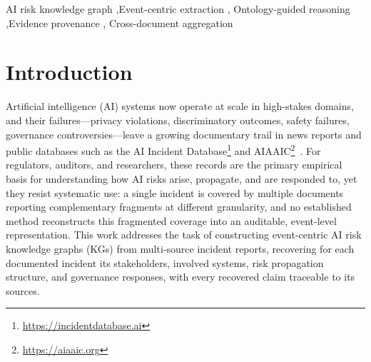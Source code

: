 \documentclass[a4paper,fleqn]{cas-dc}
\begin{document}
\begin{keywords}
AI risk knowledge graph \sep Event-centric extraction \sep
Ontology-guided reasoning \sep Evidence provenance \sep
Cross-document aggregation
\end{keywords}
{\let\pagebreak\relax \maketitle}

\section{Introduction}

Artificial intelligence (AI) systems now operate at scale in
high-stakes domains, and their failures---privacy violations,
discriminatory outcomes, safety failures, governance
controversies---leave a growing documentary trail in news reports
and public databases such as the AI Incident
Database\footnote{\url{https://incidentdatabase.ai}}
and AIAAIC\footnote{\url{https://aiaaic.org}}~\cite{McGregor_2021,10772925}.
For regulators, auditors, and researchers, these records are the
primary empirical basis for understanding how AI risks arise,
propagate, and are responded to, yet they resist systematic use: a
single incident is covered by multiple documents reporting
complementary fragments at different granularity, and no established
method reconstructs this fragmented coverage into an auditable,
event-level representation. This work addresses the task of
constructing event-centric AI risk knowledge graphs (KGs) from
multi-source incident reports, recovering for each documented
incident its stakeholders, involved systems, risk propagation
structure, and governance responses, with every recovered claim
traceable to its sources.
\end{document}
